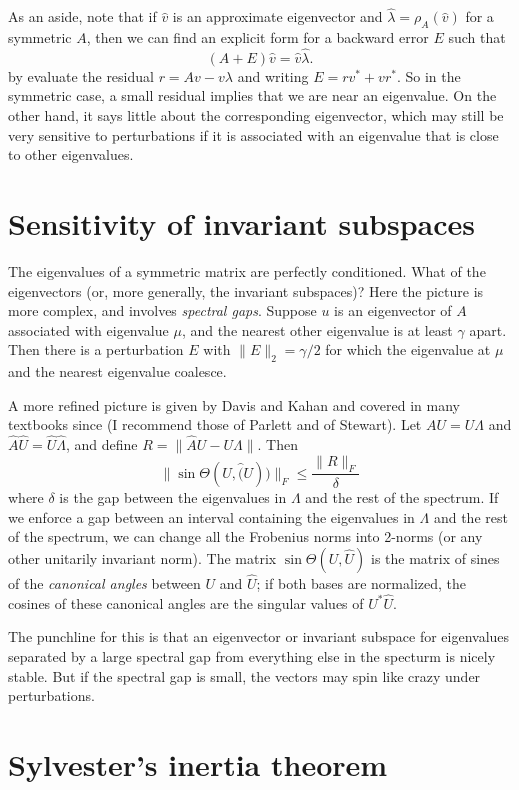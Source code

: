 \documentclass[12pt, leqno]{article} %
\begin{document}
As an aside, note that if $\hat{v}$ is an approximate eigenvector and
$\hat{\lambda} = \rho_A(\hat{v})$ for a symmetric $A$, then we can
find an explicit form for a backward error $E$ such that
\[
  (A+E)\hat{v} = \hat{v}\hat{\lambda}.
\]
by evaluate the residual $r = Av-v\lambda$ and writing $E = rv^* + vr^*$.
So in the symmetric case, a small residual implies that we are near an
eigenvalue.  On the other hand, it says little about the corresponding
eigenvector, which may still be very sensitive to perturbations if
it is associated with an eigenvalue that is close to other eigenvalues.

\section{Sensitivity of invariant subspaces}

The eigenvalues of a symmetric matrix are perfectly conditioned.  What
of the eigenvectors (or, more generally, the invariant subspaces)?
Here the picture is more complex, and involves {\em spectral gaps}.
Suppose $u$ is an eigenvector of $A$ associated with eigenvalue $\mu$,
and the nearest other eigenvalue is at least $\gamma$ apart.  Then
there is a perturbation $E$ with $\|E\|_2 = \gamma/2$ for which the
eigenvalue at $\mu$ and the nearest eigenvalue coalesce.

A more refined picture is given by Davis and Kahan and covered in many
textbooks since (I recommend those of Parlett and of Stewart).  Let
$AU = U\Lambda$ and $\hat{A} \hat{U} = \hat{U} \hat{\Lambda}$,
and define $R = \|\hat{A} U-U \Lambda\|$.  Then
\[
  \|\sin \Theta(U,\hat(U))\|_F \leq \frac{\|R\|_F}{\delta}
\]
where $\delta$ is the gap between the eigenvalues in $\Lambda$
and the rest of the spectrum.  If we enforce a gap between an interval
containing the eigenvalues in $\Lambda$ and the rest of the spectrum,
we can change all the Frobenius norms into 2-norms (or any other
unitarily invariant norm).  The matrix $\sin \Theta(U,\hat{U})$ is
the matrix of sines of the {\em canonical angles} between $U$ and $\hat{U}$;
if both bases are normalized, the cosines of these canonical angles are
the singular values of $U^* \hat{U}$.

The punchline for this is that an eigenvector or invariant subspace
for eigenvalues separated by a large spectral gap from everything
else in the specturm is nicely stable.  But if the spectral gap is small,
the vectors may spin like crazy under perturbations.

\section{Sylvester's inertia theorem}
\end{document}
